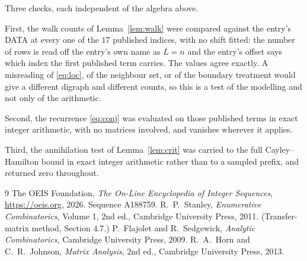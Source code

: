 \documentclass[11pt,a4paper]{article}
\theoremstyle{plain}
\theoremstyle{definition}
\begin{document}
Three checks, each independent of the algebra above.

First, the walk counts of Lemma~\ref{lem:walk} were compared against the entry's DATA at
every one of the $17$ published indices, with no shift fitted: the number of rows is
read off the entry's own name as $L=n$ and the entry's offset says which index the first
published term carries. The values agree exactly. A misreading of \eqref{eq:loc}, of the
neighbour set, or of the boundary treatment would give a different digraph and different
counts, so this is a test of the modelling and not only of the arithmetic.

Second, the recurrence \eqref{eq:conj} was evaluated on those published terms in exact
integer arithmetic, with no matrices involved, and vanishes wherever it applies.

Third, the annihilation test of Lemma~\ref{lem:crit} was carried to the full
Cayley--Hamilton bound in exact integer arithmetic rather than to a sampled prefix, and
returned zero throughout.

\begin{thebibliography}{9}
 The OEIS Foundation, \emph{The On-Line Encyclopedia of Integer
Sequences}, \url{https://oeis.org}, 2026. Sequence A188759.
 R.~P.~Stanley, \emph{Enumerative Combinatorics}, Volume 1, 2nd ed.,
Cambridge University Press, 2011. (Transfer-matrix method, Section 4.7.)
 P.~Flajolet and R.~Sedgewick, \emph{Analytic Combinatorics}, Cambridge
University Press, 2009.
 R.~A.~Horn and C.~R.~Johnson, \emph{Matrix Analysis}, 2nd ed., Cambridge
University Press, 2013.
\end{thebibliography}
\end{document}
